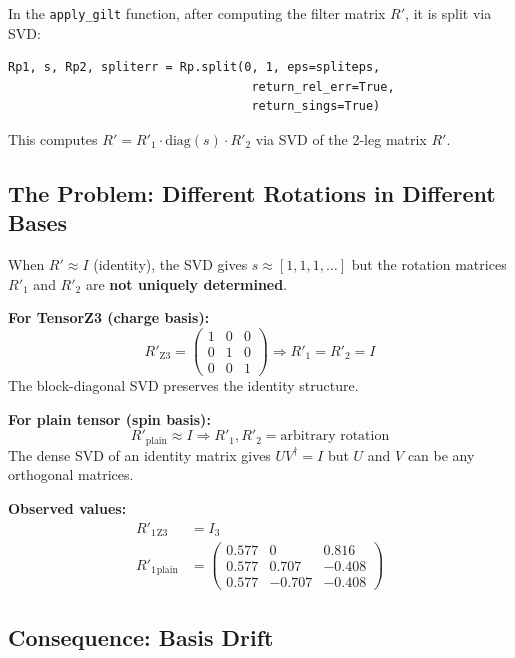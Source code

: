 \documentclass{article}
\begin{document}
In the \texttt{apply\_gilt} function, after computing the filter matrix $R'$, it is split via SVD:
\begin{lstlisting}
Rp1, s, Rp2, spliterr = Rp.split(0, 1, eps=spliteps,
                                  return_rel_err=True,
                                  return_sings=True)
\end{lstlisting}

This computes $R' = R'_1 \cdot \text{diag}(s) \cdot R'_2$ via SVD of the 2-leg matrix $R'$.

\subsection{The Problem: Different Rotations in Different Bases}

When $R' \approx I$ (identity), the SVD gives $s \approx [1, 1, 1, \ldots]$ but the rotation matrices $R'_1$ and $R'_2$ are \textbf{not uniquely determined}.

\textbf{For TensorZ3 (charge basis):}
\begin{equation}
    R'_{\text{Z3}} = \begin{pmatrix} 1 & 0 & 0 \\ 0 & 1 & 0 \\ 0 & 0 & 1 \end{pmatrix} \Rightarrow R'_1 = R'_2 = I
\end{equation}
The block-diagonal SVD preserves the identity structure.

\textbf{For plain tensor (spin basis):}
\begin{equation}
    R'_{\text{plain}} \approx I \Rightarrow R'_1, R'_2 = \text{arbitrary rotation}
\end{equation}
The dense SVD of an identity matrix gives $U V^\dagger = I$ but $U$ and $V$ can be any orthogonal matrices.

\textbf{Observed values:}
\begin{align}
    R'_1{}_{\text{Z3}} &= I_3 \\
    R'_1{}_{\text{plain}} &= \begin{pmatrix} 0.577 & 0 & 0.816 \\ 0.577 & 0.707 & -0.408 \\ 0.577 & -0.707 & -0.408 \end{pmatrix}
\end{align}

\subsection{Consequence: Basis Drift}
\end{document}

